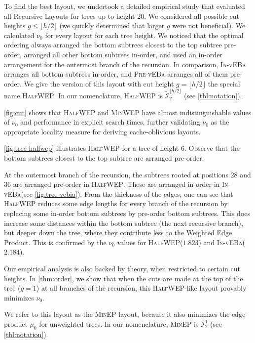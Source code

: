 \documentclass[10pt,conference,letterpaper]{IEEEtran}
\newcommand{\note}[1]{}
\newcommand{\comment}[1]{}
\newcommand{\HLs}{Hierarchical Layouts\xspace}
\newcommand{\RLs}{Recursive Layouts\xspace}
\newcommand{\pvla}{\textsc{Pre-vEBa}\xspace}
\newcommand{\ivla}{\textsc{In-vEBa}\xspace}
\newcommand{\WEP}{Weighted Edge Product\xspace}
\newcommand{\IN}{\ensuremath{\mathcal{I}}\xspace}
\newcommand{\alt}[1]{\widetilde{#1}}
\newcommand{\FLOOR}[1]{\ensuremath{\lfloor #1 \rfloor}\xspace}
\newcommand{\pmean}[1][p]{\ensuremath{\mu_{#1}}\xspace}
\newcommand{\pwmean}[1][p]{\ensuremath{\nu_{#1}}\xspace}
\newcommand{\minep}{\textsc{MinEP}\xspace}
\newcommand{\minwep}{\textsc{MinWEP}\xspace}
\newcommand{\halfwep}{\textsc{HalfWEP}\xspace}
\begin{document}
\note{Do we need to discuss dynamic trees (insertions/deletions) or incomplete trees? I don't think we need to, since we refer to Bender's papers that present dynamic search trees. And it is not the scope of this paper anyway.}
To find the best layout, we undertook a detailed empirical study that evaluated all \RLs for trees up to height $20$.
We considered all possible cut heights $g \leq \FLOOR{h/2}$ (we quickly determined that larger $g$ were not beneficial). We calculated \pwmean[0] for every
layout 
for each tree height. We noticed that the optimal ordering always
arranged the bottom subtrees closest to the top subtree pre-order, arranged all other bottom subtrees in-order, and used an in-order arrangement for the outermost branch of the recursion. In comparison, \ivla arranges all bottom subtrees in-order, and \pvla arranges all of them pre-order. We give the version of this layout with cut height $g = \FLOOR{h/2}$ the special name \halfwep. In our nomenclature, \halfwep is $\alt{\IN}^{\FLOOR{h/2}}_2$ (see \autoref{tbl:notation}).

\autoref{fig:cut} shows that \halfwep and \minwep have almost indistinguishable values of \pwmean[0] and performance in explicit search times, further validating \pwmean[0] as the appropriate locality measure for deriving cache-oblivious layouts. 

\autoref{fig:tree-halfwep} illustrates \halfwep for a tree of height $6$. Observe that the bottom subtrees closest to the top subtree are arranged pre-order. 
\comment{are the closest to the top subtree }
At the outermost branch of the recursion, the subtrees rooted at positions $28$ and $36$ 
are arranged pre-order in \halfwep. These are arranged in-order in \ivla (see \autoref{fig:tree-vebia}). From the thickness of the edges, one can see that \halfwep reduces some edge lengths for every branch of the recursion by replacing some in-order bottom subtrees by pre-order bottom subtrees. This does increase some distances within the bottom subtree (the next recursive branch), but deeper down the tree, where they contribute less to the \WEP. This is confirmed by the \pwmean[0] values for \halfwep ($1.823$) and \ivla ($2.184$).

\note{Need to talk about \halfwep and \minwep almost identical. Done.}

\comment{
We believe that if we restrict ourselves to \HLs with cut height $g=\FLOOR{h/2}$,
then \halfwep minimizes \pwmean[0]. This is a conjecture, based on some theoretical results and empirical observations. Empirically, based on experiments on trees up to a height of $32$, we observed that this is true.
}
\note{We did? No. Changed sentence accordingly.}
Our empirical analysis is also backed by theory, when restricted to certain cut heights. In \autoref{thm:order}, we show that when the cuts are made at the top of the tree ($g = 1$) at all branches of the recursion, this \halfwep-like layout provably minimizes \pwmean[0]. 
\comment{
In this layout, a pre-order subtree is ordered as
$A, \bm{B_1}, B_2$, and an in-order subtree is ordered as $\bm{B_1},  A, \bm{B_2}$.}
We refer to this layout as the \minep layout, because it also minimizes the edge product \pmean[0] for unweighted trees.
In our nomenclature, \minep is $\IN^1_2$ (see \autoref{tbl:notation}).
\end{document}
